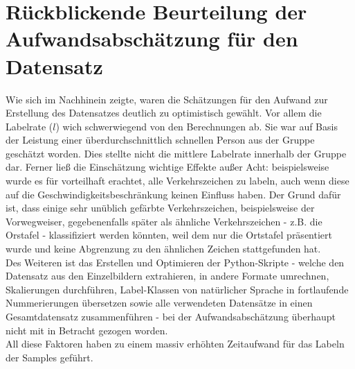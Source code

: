 \documentclass[12pt,a4paper,ngerman,enabledeprecatedfontcommands]{scrreprt}
\begin{document}
\section{Rückblickende Beurteilung der Aufwandsabschätzung für den Datensatz}
\label{sec:aufwandsabschaetzung2}
Wie sich im Nachhinein zeigte, waren die Schätzungen für den Aufwand zur Erstellung des Datensatzes deutlich zu optimistisch gewählt. Vor allem die Labelrate ($l$) wich schwerwiegend von den Berechnungen ab. Sie war auf Basis der Leistung einer überdurchschnittlich schnellen Person aus der Gruppe geschätzt worden. Dies stellte nicht die mittlere Labelrate innerhalb der Gruppe dar. Ferner ließ die Einschätzung wichtige Effekte außer Acht: beispielsweise wurde es für vorteilhaft erachtet, alle Verkehrszeichen zu labeln, auch wenn diese auf die Geschwindigkeitsbeschränkung keinen Einfluss haben. Der Grund dafür ist, dass einige sehr unüblich gefärbte Verkehrszeichen, beispielsweise der Vorwegweiser, gegebenenfalls später als ähnliche Verkehrszeichen - z.B. die Orstafel - klassifiziert werden könnten, weil dem  nur die Ortstafel präsentiert wurde und keine Abgrenzung zu den ähnlichen Zeichen stattgefunden hat.\\
Des Weiteren ist das Erstellen und Optimieren der Python-Skripte - welche den Datensatz aus den Einzelbildern extrahieren, in andere Formate umrechnen, Skalierungen durchführen, Label-Klassen von natürlicher Sprache in fortlaufende Nummerierungen übersetzen sowie alle verwendeten Datensätze in einen Gesamtdatensatz zusammenführen - bei der Aufwandsabschätzung überhaupt nicht mit in Betracht gezogen worden.\\
All diese Faktoren haben zu einem massiv erhöhten Zeitaufwand für das Labeln der Samples geführt.\\

\end{document}
